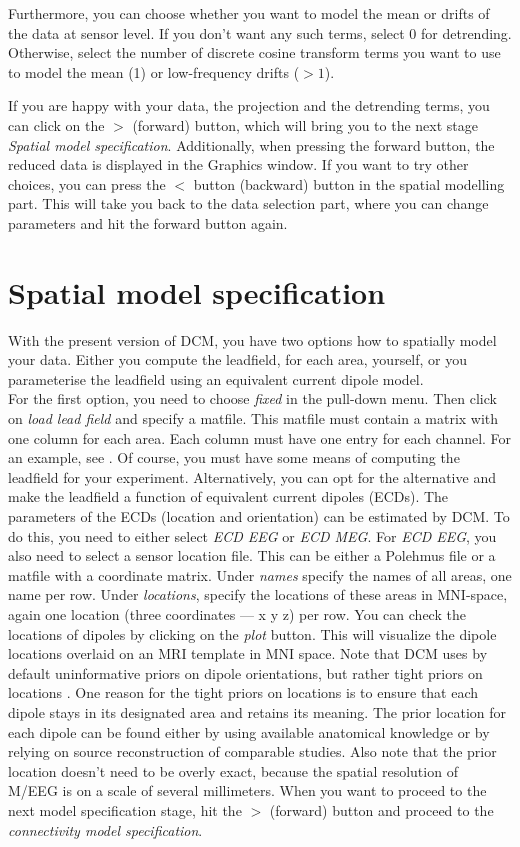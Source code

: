 Furthermore, you can choose whether you want to model the mean or
drifts of the data at sensor level. If you don't want any such terms,
select 0 for detrending. Otherwise, select the number of discrete cosine
transform terms you want to use to model the mean (1) or low-frequency
drifts ($> 1$).

If you are happy with your data, the projection and the detrending
terms, you can click on the $>$ (forward) button, which will bring you to
the next stage \textit{Spatial model specification}. Additionally,
when pressing the forward button, the reduced data is displayed in the
Graphics window. If you want to try other choices, you can press
the $<$ button (backward) button in the spatial modelling
part. This will take you back to the data selection part, where you
can change parameters and hit the forward button again.

\section{Spatial model specification}
With the present version of DCM, you have two options how to spatially
model your data. Either you compute the leadfield, for each area,
yourself, or you parameterise the leadfield using an equivalent
current dipole model.\\

For the first option, you need to choose
\textit{fixed} in the pull-down menu. Then click on \textit{load lead
field} and specify a matfile. This matfile must contain a matrix with
one column for each area. Each column must have one entry for each
channel. For an example, see \cite{david_dcm_erp}. Of course, you must have some
means of computing the leadfield for your experiment. Alternatively,
you can opt for the alternative and make the leadfield a function of
equivalent current dipoles (ECDs). The parameters of the ECDs
(location and orientation) can be estimated by DCM. To do this, you
need to either select \textit{ECD EEG} or \textit{ECD MEG}. For
\textit{ECD EEG}, you also need to select a sensor location file. This
can be either a Polehmus file or a matfile with a coordinate
matrix. Under \textit{names} specify the names of all areas, one name
per row. Under \textit{locations}, specify the locations of these
areas in MNI-space, again one location (three coordinates --- x y z) per
row. You can check the locations of dipoles by clicking on the
\textit{plot} button. This will visualize the dipole locations
overlaid on an MRI template in MNI space. Note that DCM uses by
default uninformative priors on 
dipole orientations, but rather tight priors on locations
\cite{sjk_dcm_erp}. One reason for the tight priors on locations is to
ensure that 
each dipole stays in its designated area and retains its meaning. The
prior location for each dipole can be found either by using available
anatomical knowledge or by relying on source reconstruction of
comparable studies. Also note that the prior location doesn't need to
be overly exact, because the spatial resolution of M/EEG is on a scale
of several millimeters. When you want to proceed to the next model
specification stage, hit the $>$ (forward) button and proceed
to the \textit{connectivity model specification}.


